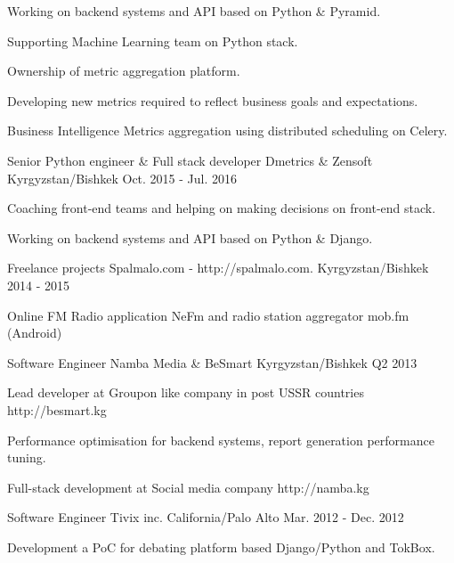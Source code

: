 \begin{cventries}
{\begin{cvitems}
        \item {Working on backend systems and API based on Python \& Pyramid.}
        \item {Supporting Machine Learning team on Python stack.}
        \item {Ownership of metric aggregation platform.}
        \item {Developing new metrics required to reflect business goals and expectations.}
        \item {Business Intelligence Metrics aggregation using distributed scheduling on Celery.}
      \end{cvitems}
    }
  \cventry
    {Senior Python engineer \& Full stack developer}
    {Dmetrics \& Zensoft}
    {Kyrgyzstan/Bishkek}
    {Oct. 2015 - Jul. 2016}
    {
      \begin{cvitems}
        \item {Coaching front-end teams and helping on making decisions on front-end stack.}
        \item {Working on backend systems and API based on Python \& Django.}
      \end{cvitems}
    }
  \cventry
    {Freelance projects}
    {Spalmalo.com - http://spalmalo.com.}
    {Kyrgyzstan/Bishkek}
    {2014 - 2015}
    {
      \begin{cvitems}
        \item {Online FM Radio application NeFm and radio station aggregator mob.fm (Android)}
      \end{cvitems}
    }
  \cventry
    {Software Engineer}
    {Namba Media \& BeSmart}
    {Kyrgyzstan/Bishkek}
    {Q2 2013}
    {
      \begin{cvitems}
        \item {Lead developer at Groupon like company in post USSR countries http://besmart.kg}
        \item {Performance optimisation for backend systems, report generation performance tuning.}
        \item {Full-stack development at Social media company http://namba.kg}
      \end{cvitems}
    }
  \cventry
    {Software Engineer}
    {Tivix inc.}
    {California/Palo Alto}
    {Mar. 2012 - Dec. 2012}
    {
      \begin{cvitems}
        \item {Development a PoC for debating platform based Django/Python and TokBox.}
      \end{cvitems}
}
\end{cventries}
